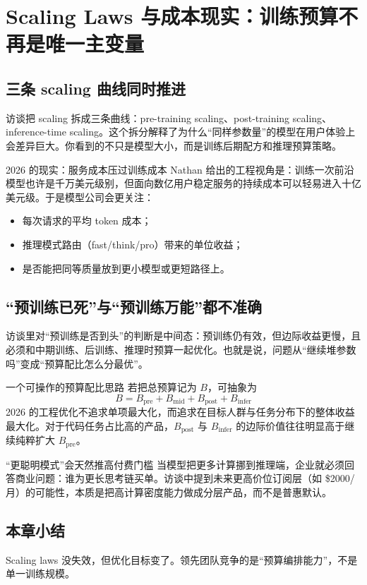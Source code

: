 \section{Scaling Laws 与成本现实：训练预算不再是唯一主变量}

\subsection{三条 scaling 曲线同时推进}

访谈把 scaling 拆成三条曲线：pre-training scaling、post-training scaling、inference-time scaling。这个拆分解释了为什么“同样参数量”的模型在用户体验上会差异巨大。你看到的不只是模型大小，而是训练后期配方和推理预算策略。

\begin{importantbox}{2026 的现实：服务成本压过训练成本}
Nathan 给出的工程视角是：训练一次前沿模型也许是千万美元级别，但面向数亿用户稳定服务的持续成本可以轻易进入十亿美元级。于是模型公司会更关注：
\begin{itemize}[leftmargin=1.5em]
    \item 每次请求的平均 token 成本；
    \item 推理模式路由（fast/think/pro）带来的单位收益；
    \item 是否能把同等质量放到更小模型或更短路径上。
\end{itemize}
\end{importantbox}

\subsection{“预训练已死”与“预训练万能”都不准确}

访谈里对“预训练是否到头”的判断是中间态：预训练仍有效，但边际收益更慢，且必须和中期训练、后训练、推理时预算一起优化。也就是说，问题从“继续堆参数吗”变成“预算配比怎么分最优”。

\begin{knowledgebox}{一个可操作的预算配比思路}
若把总预算记为 $B$，可抽象为
\[
B = B_{\text{pre}} + B_{\text{mid}} + B_{\text{post}} + B_{\text{infer}}
\]
2026 的工程优化不追求单项最大化，而追求在目标人群与任务分布下的整体收益最大化。对于代码任务占比高的产品，$B_{\text{post}}$ 与 $B_{\text{infer}}$ 的边际价值往往明显高于继续纯粹扩大 $B_{\text{pre}}$。
\end{knowledgebox}

\begin{warningbox}{“更聪明模式”会天然推高付费门槛}
当模型把更多计算挪到推理端，企业就必须回答商业问题：谁为更长思考链买单。访谈中提到未来更高价位订阅层（如 \$2000/月）的可能性，本质是把高计算密度能力做成分层产品，而不是普惠默认。
\end{warningbox}

\subsection{本章小结}

Scaling laws 没失效，但优化目标变了。领先团队竞争的是“预算编排能力”，不是单一训练规模。

